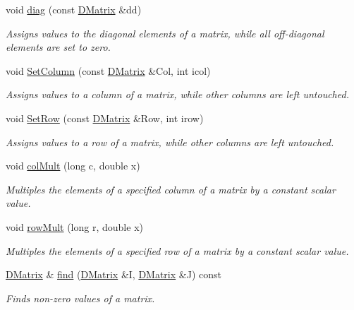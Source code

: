 \begin{DoxyCompactItemize}
void \hyperlink{classDMatrix_ae18275d9d832807ea53e4ccb93e461f0}{diag} (const \hyperlink{classDMatrix}{DMatrix} \&dd)
\begin{DoxyCompactList}\small\item\em Assigns values to the diagonal elements of a matrix, while all off-\/diagonal elements are set to zero. \item\end{DoxyCompactList}\item 
void \hyperlink{classDMatrix_af2c9e4ddf67ac9cf85141f1afb6cde37}{SetColumn} (const \hyperlink{classDMatrix}{DMatrix} \&Col, int icol)
\begin{DoxyCompactList}\small\item\em Assigns values to a column of a matrix, while other columns are left untouched. \item\end{DoxyCompactList}\item 
void \hyperlink{classDMatrix_a8cc97e6d3bb30a15c521d822638949eb}{SetRow} (const \hyperlink{classDMatrix}{DMatrix} \&Row, int irow)
\begin{DoxyCompactList}\small\item\em Assigns values to a row of a matrix, while other columns are left untouched. \item\end{DoxyCompactList}\item 
void \hyperlink{classDMatrix_a54df2f008095aa1ec06ecebce8073c38}{colMult} (long c, double x)
\begin{DoxyCompactList}\small\item\em Multiples the elements of a specified column of a matrix by a constant scalar value. \item\end{DoxyCompactList}\item 
void \hyperlink{classDMatrix_a3907e2350b967ee27825eb9b9c6f4992}{rowMult} (long r, double x)
\begin{DoxyCompactList}\small\item\em Multiples the elements of a specified row of a matrix by a constant scalar value. \item\end{DoxyCompactList}\item 
\hyperlink{classDMatrix}{DMatrix} \& \hyperlink{classDMatrix_a8b15c0468cccb85d5102e4e1138e8f44}{find} (\hyperlink{classDMatrix}{DMatrix} \&I, \hyperlink{classDMatrix}{DMatrix} \&J) const 
\begin{DoxyCompactList}\small\item\em Finds non-\/zero values of a matrix. \item\end{DoxyCompactList}\item 

\end{DoxyCompactItemize}
